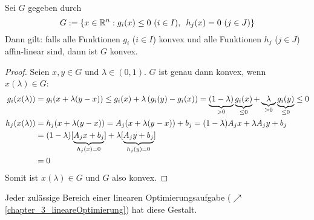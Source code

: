 \begin{aussage} %
	Sei $G$ gegeben durch
	\begin{equation*}
		G \mathrel{:=} \left\{ x \in \mathbb{R}^n : g_i(x) \le 0 \ (i \in I), \enskip h_j(x) = 0 \ (j \in J) \right\}
	\end{equation*}
	Dann gilt: falls alle Funktionen $g_i$ ($i \in I$) konvex und alle Funktionen $h_j$ ($j \in J$) affin-linear sind, dann ist $G$ konvex.
\end{aussage}
\begin{proof}
	Seien $x,y \in G$ und $\lambda \in (0,1)$. $G$ ist genau dann konvex, wenn $x(\lambda) \in G$:
	\begin{equation*}
		\begin{aligned}
		g_i(x(\lambda)) &= g_i(x + \lambda (y-x)) \le g_i(x) + \lambda \left( g_i(y) - g_i(x) \right) = \underbrace{(1-\lambda)}_{>0} \underbrace{g_i(x)}_{\le 0} + \underbrace{\lambda}_{>0} \underbrace{g_i(y)}_{\le 0} 
		\le 0 \\
		h_j(x(\lambda)) &= h_j(x + \lambda(y-x)) = A_j(x+\lambda(y-x)) + b_j = (1-\lambda) A_j x + \lambda A_j y + b_j \\
		&= (1-\lambda) [\underbrace{A_j x + b_j}_{h_j(x) = 0}] + \lambda [\underbrace{A_j y + b_j}_{h_j(y) = 0}] \\
		&= 0
		\end{aligned}
	\end{equation*}
	Somit ist $x(\lambda) \in G$ und $G$ also konvex.
\end{proof}

Jeder zulässige Bereich einer linearen Optimierungsaufgabe ($\nearrow$ \cref{chapter_3_lineareOptimierung}) hat diese Gestalt.